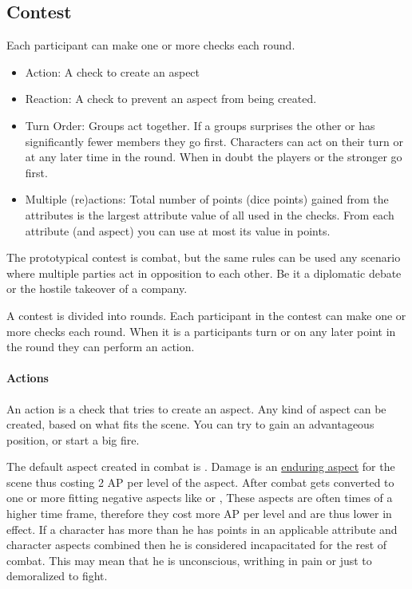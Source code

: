 \documentclass[11pt]{article}
\begin{document}
{\subsection{Contest}
\label{sec:org3c8dab4}
\begin{short}
Each participant can make one or more checks each round.
\begin{itemize}
\item Action: A check to create an aspect
\item Reaction: A check to prevent an aspect from being created.
\item Turn Order: Groups act together. If a groups surprises the other or has significantly fewer members they go first. Characters can act on their turn or at any later time in the round. When in doubt the players or the stronger go first.
\item Multiple (re)actions: Total number of points (dice points) gained from the attributes is the largest attribute value of all used in the checks. From each attribute (and aspect) you can use at most its value in points.
\end{itemize}
\end{short}

The prototypical contest is combat, but the same rules can be used any scenario where multiple parties act in opposition to each other. Be it a diplomatic debate or the hostile takeover of a company. 

A contest is divided into rounds. Each participant in the contest can make one or more checks each round. When it is a participants turn or on any later point in the round they can perform an action.
\paragraph*{Actions}
\label{sec:orgd7e6a35}
An action is a check that tries to create an aspect. Any kind of aspect can be created, based on what fits the scene. You can try to gain an advantageous position, or start a big fire.

The default aspect created in combat is . Damage is an \hyperref[sec:orgd783730]{enduring aspect} for the scene thus costing 2 AP per level of the aspect. After combat  gets converted to one or more fitting negative aspects like  or , These aspects are often times of a higher time frame, therefore they cost more AP per level and are thus lower in effect.
If a character has more  than he has points in an applicable attribute and character aspects combined then he is considered incapacitated for the rest of combat. This may mean that he is unconscious, writhing in pain or just to demoralized to fight.

}
\end{document}
